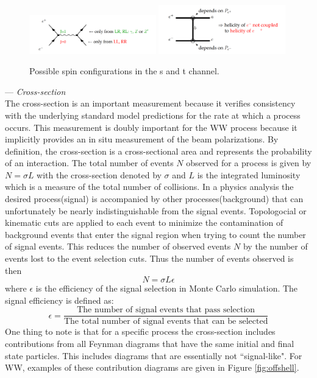 \begin{figure}

\includegraphics[width=0.49\textwidth]{helicity1.pdf}
\includegraphics[width=0.49\textwidth]{helicity2.pdf}
\caption{Possible spin configurations in the s and t channel. \cite{helicity}}
\label{fig:spindiag}
\end{figure}


--- \textit{Cross-section}\\
The cross-section is an important measurement because it verifies consistency with the underlying standard model predictions for the rate at which a process occurs. This measurement is doubly important for the WW process because it implicitly provides an in situ measurement of the beam polarizations. By definition, the cross-section is a cross-sectional area and represents the probability of an interaction. The total number of events $N$ observed for a process is given by $ N= \sigma L$ with the cross-section denoted by $\sigma$ and $L$ is the integrated luminosity which is a measure of the total number of collisions. In a physics analysis the desired process(signal) is accompanied by other processes(background) that can unfortunately be nearly indistinguishable from the signal events. Topologocial or kinematic cuts are applied to each event to minimize the contamination of background events that enter the signal region when trying to count the number of signal events. This reduces the number of observed events $N$ by the number of events lost to the event selection cuts. Thus the number of events observed is then 
\begin{equation}
N = \sigma  L  \epsilon
\end{equation}
where $\epsilon$ is the efficiency of the signal selection in Monte Carlo simulation. The signal efficiency is defined as:
 \begin{equation}
\epsilon = \frac{\text{The number of signal events that pass selection}}{ \text{The total number of signal events that can be selected}}
\end{equation} 
One thing to note is that for a specific process the cross-section includes contributions from all Feynman diagrams that have the same initial and final state particles. This includes diagrams that are essentially not ``signal-like". For WW, examples of these contribution diagrams are given in Figure \ref{fig:offshell}.

